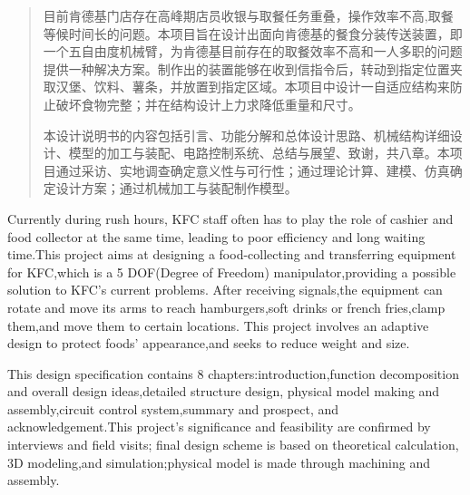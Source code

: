 
\begin{abstract}

  目前肯德基门店存在高峰期店员收银与取餐任务重叠，操作效率不高,取餐等候时间长的问题。本项目旨在设计出面向肯德基的餐食分装传送装置，即一个五自由度机械臂，为肯德基目前存在的取餐效率不高和一人多职的问题提供一种解决方案。制作出的装置能够在收到信指令后，转动到指定位置夹取汉堡、饮料、薯条，并放置到指定区域。本项目中设计一自适应结构来防止破坏食物完整；并在结构设计上力求降低重量和尺寸。

  本设计说明书的内容包括引言、功能分解和总体设计思路、机械结构详细设计、模型的加工与装配、电路控制系统、总结与展望、致谢，共八章。本项目通过采访、实地调查确定意义性与可行性；通过理论计算、建模、仿真确定设计方案；通过机械加工与装配制作模型。
 
  
\end{abstract}

\begin{enabstract}
  Currently during rush hours, KFC staff often has to play the role of cashier and food collector at the same time, leading to poor efficiency and long waiting time.This project aims at designing a food-collecting and transferring equipment for KFC,which is a 5 DOF(Degree of Freedom) manipulator,providing a possible solution to KFC's current problems. After receiving signals,the equipment can rotate and move its arms to reach hamburgers,soft drinks or french fries,clamp them,and move them to certain locations. This project involves an adaptive design to protect foods' appearance,and seeks to reduce weight and size.
  
  This design specification contains 8 chapters:introduction,function decomposition and overall design ideas,detailed structure design, physical model making and assembly,circuit control system,summary and prospect, and acknowledgement.This project's significance and feasibility are confirmed by interviews and field visits; final design scheme is based on theoretical calculation, 3D modeling,and simulation;physical model is made through machining and assembly.
\end{enabstract}
